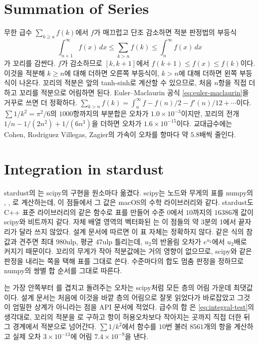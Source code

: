 \section{Summation of Series}
\label{sec:series}

무한 급수 $\sum_{k\ge a}f(k)$에서 $f$가 매끄럽고 단조 감소하면 적분 판정법의 부등식
\begin{equation}
\label{eq:integral-test}
\int_{n+1}^\infty f(x)\,dx\le\sum_{k>n}f(k)\le\int_n^\infty f(x)\,dx
\end{equation}
가 꼬리를 감싼다. $f$가 감소하므로 $[k,k+1]$에서 $f(k+1)\le f(x)\le f(k)$이다. 이것을 적분해 $k\ge n$에 대해 더하면 오른쪽 부등식이, $k>n$에 대해 더하면 왼쪽 부등식이 나온다. 꼬리의 적분은 앞의 tanh-sinh로 계산할 수 있으므로, 처음 $n$항을 직접 더하고 꼬리를 적분으로 어림하면 된다. Euler--Maclaurin 공식 \eqref{eq:euler-maclaurin}을 거꾸로 쓰면 더 정확하다. $\sum_{k>n}f(k)=\int_n^\infty f-f(n)/2-f'(n)/12+\cdots$이다. $\sum1/k^2=\pi^2/6$의 $1000$항까지의 부분합은 오차가 $1.0\times10^{-3}$이지만, 꼬리의 전개 $1/n-1/(2n^2)+1/(6n^3)$을 더하면 오차가 $1.6\times10^{-15}$이다. 교대급수에는 Cohen, Rodriguez Villegas, Zagier의 가속이 오차를 항마다 약 $5.8$배씩 줄인다\cite{cohen2000}.

\section{Integration in stardust}
\label{sec:quadrature2-stardust}

\begin{instardust}
stardust의 는 scipy의 구현을 원소마다 옮겼다. scipy는 노드와 무게의 표를 numpy의 , , 로 계산하는데, 이 점들에서 그 값은 macOS의 수학 라이브러리와 같다. stardust도 C++ 표준 라이브러리의 같은 함수로 표를 만들어 수준 $0$에서 $10$까지의 $16386$개 값이 scipy와 비트까지 같다. 자체 배열 영역의 벡터화된 는 이 점들의 약 3분의 1에서 끝자리가 달라 쓰지 않았다. 설계 문서에 따르면 이 표 자체는 정확하지 않다. 같은 식의 참값과 견주면 최대 $980$ulp, 평균 $47$ulp 틀리는데, $u_2$의 반올림 오차가 $e^{u_2}$에서 $u_2$배로 커지기 때문이다. 꼬리의 무게가 작아 적분값에는 거의 영향이 없으므로, scipy와 같은 판정을 내리는 쪽을 택해 표를 그대로 쓴다. 수준마다의 합도 멈춤 판정을 정하므로 numpy의 쌍별 합 순서를 그대로 따른다.
\end{instardust}

\begin{instardust}
는 가장 안쪽부터 를 겹치고 돌려주는 오차는 scipy처럼 모든 층의 어림 가운데 최댓값이다. 설계 문서는 처음에 이것을 바깥 층의 어림으로 잘못 읽었다가 바로잡았고 그것이 엄밀한 상계가 아니라는 점을 API 문서에 적었다. 급수의 합 은 \eqref{eq:integral-test}의 생각대로, 꼬리의 적분을 로 구하고 항이 허용오차보다 작아지는 곳까지 직접 더한 뒤 그 경계에서 적분으로 넘어간다. $\sum1/k^2$에서 함수를 $10$번 불러 $8561$개의 항을 계산하고 실제 오차 $3\times10^{-13}$에 어림 $7.4\times10^{-9}$을 낸다.
\end{instardust}

